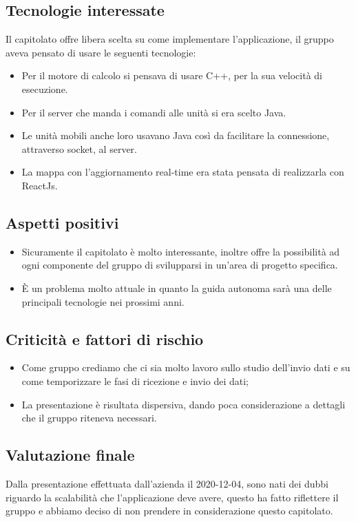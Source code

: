 \subsection{Tecnologie interessate}
Il capitolato offre libera scelta su come implementare l'applicazione, il gruppo aveva pensato di usare le seguenti tecnologie:
\begin{itemize}
\item Per il motore di calcolo si pensava di usare C++, per la sua velocità di esecuzione.
\item Per il server che manda i comandi alle unità si era scelto Java.
\item Le unità mobili anche loro usavano Java così da facilitare la connessione, attraverso socket, al server.
\item La mappa con l'aggiornamento real-time era stata pensata di realizzarla con ReactJs.
\end{itemize}

\subsection{Aspetti positivi}
\begin{itemize}
\item Sicuramente il capitolato è molto interessante, inoltre offre la possibilità ad ogni componente del gruppo di svilupparsi in un'area di progetto specifica.
\item È un problema molto attuale in quanto la guida autonoma sarà una delle principali tecnologie nei prossimi anni.
\end{itemize}

\subsection{Criticità e fattori di rischio}
\begin{itemize}
\item Come gruppo crediamo che ci sia molto lavoro sullo studio dell'invio dati e su come temporizzare le fasi di ricezione e invio dei dati;
\item La presentazione è risultata dispersiva, dando poca considerazione a dettagli che il gruppo riteneva necessari.  
\end{itemize}

\subsection{Valutazione finale}
Dalla presentazione effettuata dall'azienda il 2020-12-04, sono nati dei dubbi riguardo la scalabilità che l'applicazione deve avere, questo ha fatto riflettere il gruppo e abbiamo deciso di non prendere in considerazione questo capitolato.